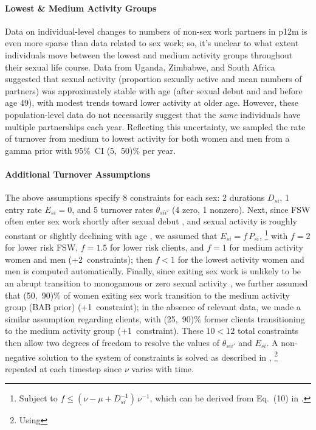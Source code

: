 \paragraph{Lowest \& Medium Activity Groups}
Data on individual-level changes to numbers of non-sex work partners in p12m
is even more sparse than data related to sex work;
so, it's unclear to what extent individuals move between the lowest and medium activity groups
throughout their sexual life course.
Data from Uganda, Zimbabwe, and South Africa \cite{Todd2009}
suggested that sexual activity (proportion sexually active and mean numbers of partners)
was approximately stable with age (after sexual debut and and before age 49),
with modest trends toward lower activity at older age.
However, these population-level data do not necessarily suggest that
the \emph{same} individuals have multiple partnerships each year.
Reflecting this uncertainty, we sampled
the rate of turnover from medium to lowest activity for both women and men
from a gamma prior with 95\%~CI (5,~50)\% per year.
\paragraph{Additional Turnover Assumptions}
The above assumptions specify 8 constraints for each sex:
2 durations $D_{si}$, 1 entry rate $E_{si} = 0$, and
5 turnover rates $\theta_{sii'}$ (4 zero, 1 nonzero).
Next, since FSW often enter sex work shortly after sexual debut \cite{Cheuk2020,Ma2020},
and sexual activity is roughly constant or slightly declining with age \cite{Todd2009},
we assumed that $E_{si} = f\,P_{si}$,%
\footnote{Subject to $f \le (\nu - \mu + D_{si}^{-1})\,\nu^{-1}$,
  which can be derived from Eq.~(10) in \cite{Knight2020}.}
with $f = 2$ for lower risk FSW, $f = 1.5$ for lower risk clients,
and $f = 1$ for medium activity women and men (+2~constraints);
then $f < 1$ for the lowest activity women and men is computed automatically.
Finally, since exiting sex work is unlikely to be
an abrupt transition to monogamous or zero sexual activity \cite{Scorgie2012,Learmonth2015},
we further assumed that (50,~90)\% of women exiting sex work
transition to the medium activity group (BAB prior) (+1~constraint);
in the absence of relevant data, we made a similar assumption regarding clients,
with (25,~90)\% former clients transitioning to the medium activity group (+1~constraint).
These $10 < 12$ total constraints then allow two degrees of freedom to resolve
the values of $\theta_{sii'}$ and $E_{si}$.
A non-negative solution to the system of constraints is solved as described in \cite{Knight2020},%
\footnote{Using }
repeated at each timestep since $\nu$ varies with time.
